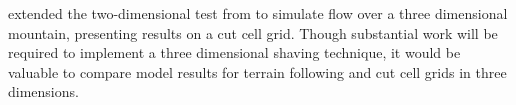 \textcite{lock2012} extended the two-dimensional test from \textcite{gallus-klemp2000} to simulate flow over a three dimensional mountain, presenting results on a cut cell grid.  Though substantial work will be required to implement a three dimensional shaving technique, it would be valuable to compare model results for terrain following and cut cell grids in three dimensions.


